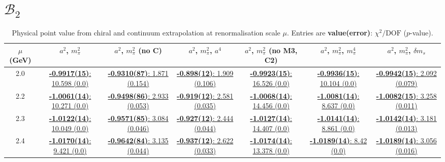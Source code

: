 \documentclass[12pt]{extarticle}
\begin{document}
\section{$\mathcal{B}_2$}
\begin{table}[h!]
\begin{center}
\begin{tabular}{|c|c|c|c|c|c|c|}
\hline
$\mu$ (GeV) & $a^2$, $m_\pi^2$& $a^2$, $m_\pi^2$ (no C)& $a^2$, $m_\pi^2$, $a^4$& $a^2$, $m_\pi^2$ (no M3, C2)& $a^2$, $m_\pi^2$, $m_\pi^4$& $a^2$, $m_\pi^2$, $\delta m_s$\\
\hline
2.0& \hyperlink{VVmAA/NPR/bag_a2m2_20.pdf.1}{\textbf{-0.9917(15)}: 10.598 (0.0)} & \hyperlink{VVmAA/NPR/bag_a2m2noC_20.pdf.1}{\textbf{-0.9310(87)}: 1.871 (0.154)} & \hyperlink{VVmAA/NPR/bag_a2a4m2_20.pdf.1}{\textbf{-0.898(12)}: 1.909 (0.106)} & \hyperlink{VVmAA/NPR/bag_a2m2mcut_20.pdf.1}{\textbf{-0.9923(15)}: 16.526 (0.0)} & \hyperlink{VVmAA/NPR/bag_a2m2m4_20.pdf.1}{\textbf{-0.9936(15)}: 10.104 (0.0)} & \hyperlink{VVmAA/NPR/bag_a2m2delm_20.pdf.1}{\textbf{-0.9942(15)}: 2.092 (0.079)}\\
2.2& \hyperlink{VVmAA/NPR/bag_a2m2_22.pdf.1}{\textbf{-1.0061(14)}: 10.271 (0.0)} & \hyperlink{VVmAA/NPR/bag_a2m2noC_22.pdf.1}{\textbf{-0.9498(86)}: 2.933 (0.053)} & \hyperlink{VVmAA/NPR/bag_a2a4m2_22.pdf.1}{\textbf{-0.919(12)}: 2.581 (0.035)} & \hyperlink{VVmAA/NPR/bag_a2m2mcut_22.pdf.1}{\textbf{-1.0068(14)}: 14.456 (0.0)} & \hyperlink{VVmAA/NPR/bag_a2m2m4_22.pdf.1}{\textbf{-1.0081(14)}: 8.637 (0.0)} & \hyperlink{VVmAA/NPR/bag_a2m2delm_22.pdf.1}{\textbf{-1.0082(15)}: 3.258 (0.011)}\\
2.3& \hyperlink{VVmAA/NPR/bag_a2m2_23.pdf.1}{\textbf{-1.0122(14)}: 10.049 (0.0)} & \hyperlink{VVmAA/NPR/bag_a2m2noC_23.pdf.1}{\textbf{-0.9571(85)}: 3.084 (0.046)} & \hyperlink{VVmAA/NPR/bag_a2a4m2_23.pdf.1}{\textbf{-0.927(12)}: 2.444 (0.044)} & \hyperlink{VVmAA/NPR/bag_a2m2mcut_23.pdf.1}{\textbf{-1.0127(14)}: 14.407 (0.0)} & \hyperlink{VVmAA/NPR/bag_a2m2m4_23.pdf.1}{\textbf{-1.0141(14)}: 8.861 (0.0)} & \hyperlink{VVmAA/NPR/bag_a2m2delm_23.pdf.1}{\textbf{-1.0142(14)}: 3.181 (0.013)}\\
2.4& \hyperlink{VVmAA/NPR/bag_a2m2_24.pdf.1}{\textbf{-1.0170(14)}: 9.421 (0.0)} & \hyperlink{VVmAA/NPR/bag_a2m2noC_24.pdf.1}{\textbf{-0.9642(84)}: 3.135 (0.044)} & \hyperlink{VVmAA/NPR/bag_a2a4m2_24.pdf.1}{\textbf{-0.937(12)}: 2.622 (0.033)} & \hyperlink{VVmAA/NPR/bag_a2m2mcut_24.pdf.1}{\textbf{-1.0174(14)}: 13.378 (0.0)} & \hyperlink{VVmAA/NPR/bag_a2m2m4_24.pdf.1}{\textbf{-1.0189(14)}: 8.42 (0.0)} & \hyperlink{VVmAA/NPR/bag_a2m2delm_24.pdf.1}{\textbf{-1.0189(14)}: 3.056 (0.016)}\\
\hline
\end{tabular}
\caption{Physical point value from chiral and continuum extrapolation at renormalisation scale $\mu$. Entries are \textbf{value(error)}: $\chi^2/\text{DOF}$ ($p$-value).}
\end{center}
\end{table}
\end{document}
